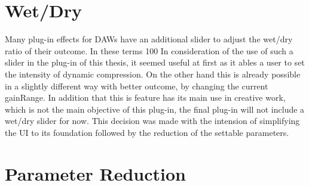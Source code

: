 \section{Wet/Dry}

Many plug-in effects for DAWs have an additional slider to adjust the wet/dry ratio of their outcome. In these terms 100%
In consideration of the use of such a slider in the plug-in of this thesis, it seemed useful at first as it ables a user to set the intensity of dynamic compression. On the other hand this is already possible in a slightly different way with better outcome, by changing the current gainRange. In addition that this is feature has its main use in creative work, which is not the main objective of this plug-in, the final plug-in will not include a wet/dry slider for now. This decision was made with the intension of simplifying the UI to its foundation followed by the reduction of the settable parameters.\\

\section{Parameter Reduction}

